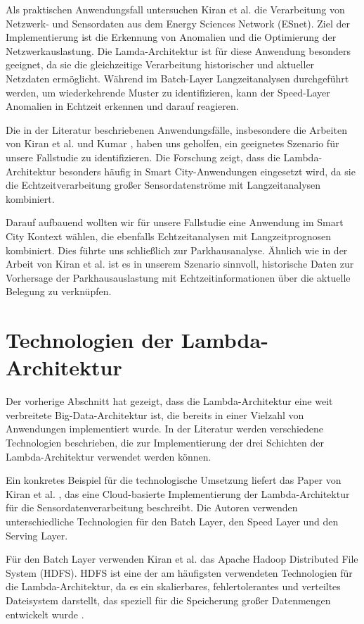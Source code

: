 Als praktischen Anwendungsfall untersuchen Kiran et al. \cite{kiran2015lambda} die Verarbeitung von Netzwerk- und Sensordaten aus dem Energy Sciences Network (ESnet). Ziel der Implementierung ist die Erkennung von Anomalien und die Optimierung der Netzwerkauslastung. Die Lamda-Architektur ist für diese Anwendung besonders geeignet, da sie die gleichzeitige Verarbeitung historischer und aktueller Netzdaten ermöglicht. Während im Batch-Layer Langzeitanalysen durchgeführt werden, um wiederkehrende Muster zu identifizieren, kann der Speed-Layer Anomalien in Echtzeit erkennen und darauf reagieren. 

Die in der Literatur beschriebenen Anwendungsfälle, insbesondere die Arbeiten von Kiran et al. \cite{kiran2015lambda} und Kumar \cite{kumar2020lambda}, haben uns geholfen, ein geeignetes Szenario für unsere Fallstudie zu identifizieren. Die Forschung zeigt, dass die Lambda-Architektur besonders häufig in Smart City-Anwendungen eingesetzt wird, da sie die Echtzeitverarbeitung großer Sensordatenströme mit Langzeitanalysen kombiniert.

Darauf aufbauend wollten wir für unsere Fallstudie eine Anwendung im Smart City Kontext wählen, die ebenfalls Echtzeitanalysen mit Langzeitprognosen kombiniert. Dies führte uns schließlich zur Parkhausanalyse. Ähnlich wie in der Arbeit von Kiran et al. \cite{kiran2015lambda} ist es in unserem Szenario sinnvoll, historische Daten zur Vorhersage der Parkhausauslastung mit Echtzeitinformationen über die aktuelle Belegung zu verknüpfen.

\section{Technologien der Lambda-Architektur}
Der vorherige Abschnitt hat gezeigt, dass die Lambda-Architektur eine weit verbreitete Big-Data-Architektur ist, die bereits in einer Vielzahl von Anwendungen implementiert wurde. In der Literatur werden verschiedene Technologien beschrieben, die zur Implementierung der drei Schichten der Lambda-Architektur verwendet werden können.

Ein konkretes Beispiel für die technologische Umsetzung liefert das Paper von Kiran et al. \cite{kiran2015lambda}, das eine Cloud-basierte Implementierung der Lambda-Architektur für die Sensordatenverarbeitung beschreibt. Die Autoren verwenden unterschiedliche Technologien für den Batch Layer, den Speed Layer und den Serving Layer.

Für den Batch Layer verwenden Kiran et al. \cite{kiran2015lambda} das Apache Hadoop Distributed File System (HDFS). HDFS ist eine der am häufigsten verwendeten Technologien für die Lambda-Architektur, da es ein skalierbares, fehlertolerantes und verteiltes Dateisystem darstellt, das speziell für die Speicherung großer Datenmengen entwickelt wurde \cite{ganelin2016spark}.

